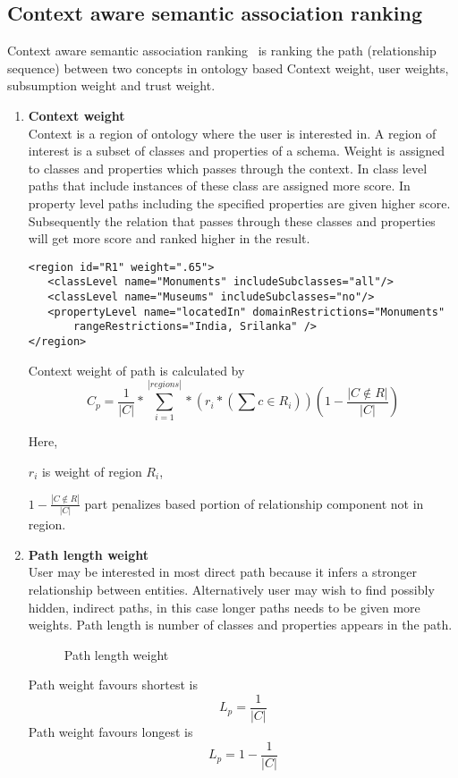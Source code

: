\begin{enumerate}
\section{Context aware semantic association ranking}
Context aware semantic association ranking~\citep{aleman2003context} is ranking the path (relationship sequence) between two concepts in ontology based Context weight, user weights, subsumption weight and trust weight.

\begin{enumerate}

\item{\textbf{Context weight}}\\
Context is a region of ontology where the user is interested in. A region of interest is a subset of classes and properties of a schema. Weight is assigned to classes and properties which passes through the context. In class level paths that include instances of these class are assigned more score. In property level paths including the specified properties are given higher score. Subsequently  the relation that passes through these classes and properties will get more score and ranked higher in the result.
\begin{verbatim}
<region id="R1" weight=".65">
   <classLevel name="Monuments" includeSubclasses="all"/>
   <classLevel name="Museums" includeSubclasses="no"/>
   <propertyLevel name="locatedIn" domainRestrictions="Monuments"
       rangeRestrictions="India, Srilanka" />
</region>
\end{verbatim}

Context weight of path is calculated by
\begin{equation}
	C_p = \frac{1}{|C|} * \sum_{i=1}^{|regions|} * (r_i * (\sum c \in R_i)) (1 - \frac{|C \notin R|}{|C|} ) 
\end{equation}

Here,

$r_i$ is weight of region $R_i$,

$1-\frac{|C \notin R|}{|C|}$ part penalizes based portion of relationship component not in region.


\item{\textbf{Path length weight}}\\
User may be interested in most direct path because it infers a stronger relationship between entities. Alternatively user may wish to find possibly hidden, indirect paths, in this case longer paths needs to be given more weights. Path length is number of classes and properties appears in the path. 
\begin{figure}[h]
\begin{center}
\end{center}
\caption{Path length weight}
\end{figure}
Path weight favours shortest is
\begin{equation}
	L_p	=	\frac{1}{|C|}
\end{equation}
Path weight favours longest is
\begin{equation}
	L_p	=	1 - \frac{1}{|C|}
\end{equation}


\end{enumerate}
\end{enumerate}
